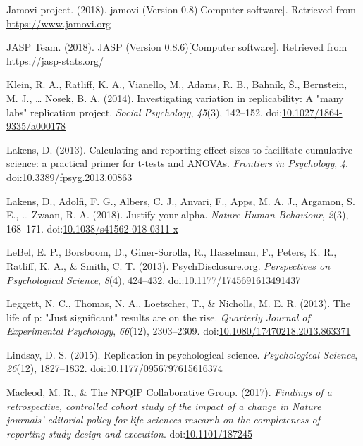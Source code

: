 \documentclass[english,,man]{apa6}
\begin{document}
\leavevmode\hypertarget{ref-jamovi2018}{}%
Jamovi project. (2018). jamovi (Version 0.8){[}Computer software{]}. Retrieved from \url{https://www.jamovi.org}

\leavevmode\hypertarget{ref-JASP2018}{}%
JASP Team. (2018). JASP (Version 0.8.6){[}Computer software{]}. Retrieved from \url{https://jasp-stats.org/}

\leavevmode\hypertarget{ref-Klein2014c}{}%
Klein, R. A., Ratliff, K. A., Vianello, M., Adams, R. B., Bahník, Š., Bernstein, M. J., \ldots{} Nosek, B. A. (2014). Investigating variation in replicability: A "many labs" replication project. \emph{Social Psychology}, \emph{45}(3), 142--152. doi:\href{https://doi.org/10.1027/1864-9335/a000178}{10.1027/1864-9335/a000178}

\leavevmode\hypertarget{ref-Lakens2013}{}%
Lakens, D. (2013). Calculating and reporting effect sizes to facilitate cumulative science: a practical primer for t-tests and ANOVAs. \emph{Frontiers in Psychology}, \emph{4}. doi:\href{https://doi.org/10.3389/fpsyg.2013.00863}{10.3389/fpsyg.2013.00863}

\leavevmode\hypertarget{ref-Lakens2018}{}%
Lakens, D., Adolfi, F. G., Albers, C. J., Anvari, F., Apps, M. A. J., Argamon, S. E., \ldots{} Zwaan, R. A. (2018). Justify your alpha. \emph{Nature Human Behaviour}, \emph{2}(3), 168--171. doi:\href{https://doi.org/10.1038/s41562-018-0311-x}{10.1038/s41562-018-0311-x}

\leavevmode\hypertarget{ref-LeBel2013}{}%
LeBel, E. P., Borsboom, D., Giner-Sorolla, R., Hasselman, F., Peters, K. R., Ratliff, K. A., \& Smith, C. T. (2013). PsychDisclosure.org. \emph{Perspectives on Psychological Science}, \emph{8}(4), 424--432. doi:\href{https://doi.org/10.1177/1745691613491437}{10.1177/1745691613491437}

\leavevmode\hypertarget{ref-Leggett}{}%
Leggett, N. C., Thomas, N. A., Loetscher, T., \& Nicholls, M. E. R. (2013). The life of p: "Just significant" results are on the rise. \emph{Quarterly Journal of Experimental Psychology}, \emph{66}(12), 2303--2309. doi:\href{https://doi.org/10.1080/17470218.2013.863371}{10.1080/17470218.2013.863371}

\leavevmode\hypertarget{ref-Lindsay2015}{}%
Lindsay, D. S. (2015). Replication in psychological science. \emph{Psychological Science}, \emph{26}(12), 1827--1832. doi:\href{https://doi.org/10.1177/0956797615616374}{10.1177/0956797615616374}

\leavevmode\hypertarget{ref-Macleod2017}{}%
Macleod, M. R., \& The NPQIP Collaborative Group. (2017). \emph{Findings of a retrospective, controlled cohort study of the impact of a change in Nature journals' editorial policy for life sciences research on the completeness of reporting study design and execution}. doi:\href{https://doi.org/10.1101/187245}{10.1101/187245}
\end{document}
